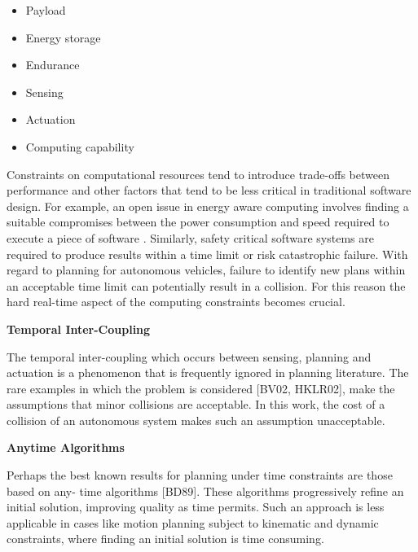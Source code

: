\begin{itemize}
\item Payload
\item Energy storage
\item Endurance
\item Sensing
\item Actuation
\item Computing capability
\end{itemize}

Constraints on computational resources tend to introduce trade-offs between performance
and other factors that tend to be less critical in traditional software design. For example,
an open issue in energy aware computing involves finding a suitable compromises between
the power consumption and speed required to execute a piece of software \cite{Walker2011}.
Similarly, safety critical software systems are required to produce results within a time limit or
risk catastrophic failure. With regard to planning for autonomous vehicles, failure to identify
new plans within an acceptable time limit can potentially result in a collision. For this
reason the hard real-time aspect of the computing constraints becomes crucial.

\begin{framed}
\theoremstyle{remark}
\begin{remark}{\textbf{Temporal Inter-Coupling}}
 
The temporal inter-coupling which occurs between sensing, planning and actuation is a
phenomenon that is frequently ignored in planning literature. The rare examples in which
the problem is considered [BV02, HKLR02], make the assumptions that minor collisions are
acceptable. In this work, the cost of a collision of an autonomous system makes such an
assumption unacceptable.
\end{remark}
\end{framed}


\begin{framed}
\theoremstyle{remark}
\begin{remark}{\textbf{Anytime Algorithms}}
 
Perhaps the best known results for planning under time constraints are those based on any-
time algorithms [BD89]. These algorithms progressively refine an initial solution, improving
quality as time permits. Such an approach is less applicable in cases like motion planning subject 
to kinematic and dynamic constraints, where finding an initial solution is time consuming.
\end{remark}
\end{framed}


